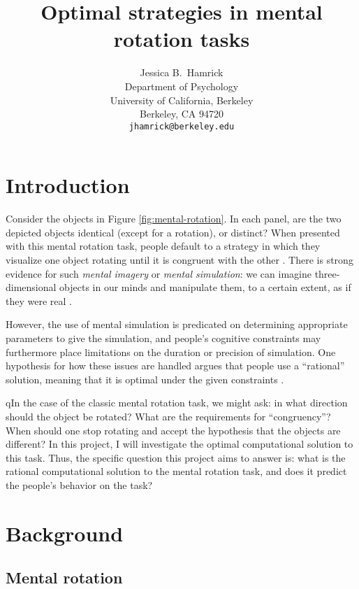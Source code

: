 \documentclass{article} %
\title{Optimal strategies in mental rotation tasks}
\author{Jessica B.~Hamrick\\
  Department of Psychology\\
  University of California, Berkeley\\
  Berkeley, CA 94720\\
  \texttt{jhamrick@berkeley.edu}}
\begin{document}
\maketitle

\section{Introduction}


Consider the objects in Figure \ref{fig:mental-rotation}. In each
panel, are the two depicted objects identical (except for a rotation),
or distinct? When presented with this mental rotation task, people
default to a strategy in which they visualize one object rotating
until it is congruent with the other \cite{Shepard1971}. There is
strong evidence for such \textit{mental imagery} or \textit{mental
  simulation}: we can imagine three-dimensional objects in our minds
and manipulate them, to a certain extent, as if they were real
\cite{Kosslyn:2009tj}.

However, the use of mental simulation is predicated on determining
appropriate parameters to give the simulation, and people's cognitive
constraints may furthermore place limitations on the duration or
precision of simulation. One hypothesis for how these issues are
handled argues that people use a ``rational'' solution, meaning that
it is optimal under the given constraints
\cite{Lieder:2012wg,Vul:2009wy,Griffiths2012a}.

qIn the case of the classic mental rotation task, we might ask: in what
direction should the object be rotated?  What are the requirements for
``congruency''? When should one stop rotating and accept the
hypothesis that the objects are different? In this project, I will
investigate the optimal computational solution to this task. Thus, the
specific question this project aims to answer is: what is the rational
computational solution to the mental rotation task, and does it
predict the people's behavior on the task?

\section{Background}


\subsection{Mental rotation}
\end{document}
